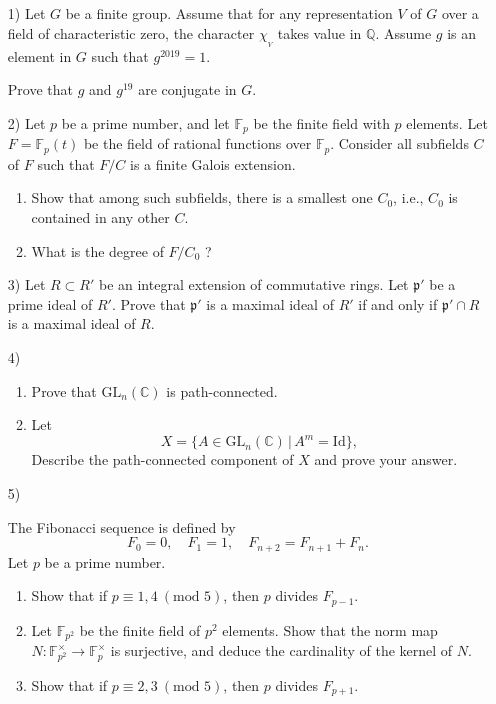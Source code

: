 \documentclass[10pt]{article}
\begin{document}
\begin{itemize}
\item[1)]Let $G$ be a finite group. Assume that for any representation $V$ of $G$ over a field of characteristic zero, the character $\chi_{_V}$ takes value in $\mathbb{Q}$.  Assume $g$ is an element in $G$ such that $g^{2019}=1$.

Prove that $g$ and $g^{19}$ are conjugate in $G$.



\item[2)] Let $p$ be a prime number, and let $\mathbb{F}_p$ be the finite field with $p$ elements.
Let $F=\mathbb{F}_p(t)$ be the field of rational functions over $\mathbb{F}_p$. Consider all subfields $C$ of $F$ such that $F/C$ is a finite Galois extension.

\begin{enumerate}
\item Show that among such subfields, there is a smallest one $C_0$, i.e., $C_0$ is contained in any other $C$.
\item What is the degree of $F/C_0$ ?
\end{enumerate}



\item[3)]Let $R\subset R'$ be an integral extension of commutative rings. Let $\mathfrak{p}'$ be a prime ideal of $R'$. Prove that $\mathfrak{p}'$ is a maximal ideal of $R'$ if and only if $\mathfrak{p}'\cap R$ is a maximal ideal of $R$.


\item[4)]
\begin{enumerate}
\item Prove that $\mathrm{GL}_n(\mathbb{C})$ is path-connected.
\item Let
 $$X=\{A\in\mathrm{GL}_n(\mathbb{C})\,|\, A^m=\mathrm{Id}\},$$
Describe the path-connected component of $X$ and prove your answer.
\end{enumerate}


\item[5)]


The Fibonacci sequence is defined by
$$F_0=0, \quad F_1=1, \quad F_{n+2}=F_{n+1}+F_n.$$
Let $p$ be a prime number.

\begin{enumerate}
\item Show that if $p\equiv 1, 4\ (\text{mod }5)$, then $p$ divides $F_{p-1}$.
\item Let $\mathbb{F}_{p^2}$ be the finite field of $p^2$ elements. Show that the norm map $N:\mathbb{F}^\times_{p^2}\to \mathbb{F}^\times_p$ is surjective, and deduce the cardinality of the kernel of $N$.
\item Show that if $p\equiv 2, 3\ (\text{mod }5)$, then $p$ divides $F_{p+1}$.
\end{enumerate}
\end{itemize}
\end{document}
